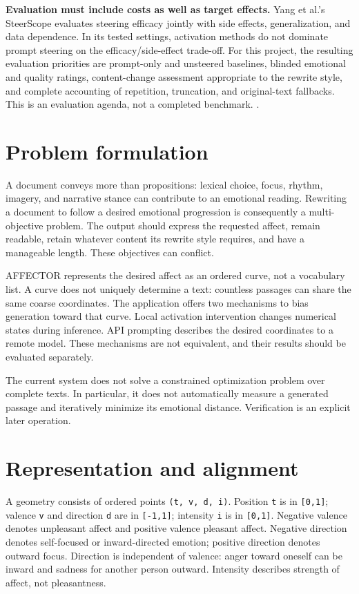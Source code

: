\documentclass[manuscript,screen,nonacm]{acmart}
\begin{document}
\textbf{Evaluation must include costs as well as target effects.} Yang
et al.'s SteerScope evaluates steering efficacy jointly with side
effects, generalization, and data dependence. In its tested settings,
activation methods do not dominate prompt steering on the
efficacy/side-effect trade-off. For this project, the resulting
evaluation priorities are prompt-only and unsteered baselines, blinded
emotional and quality ratings, content-change assessment appropriate to
the rewrite style, and complete accounting of repetition, truncation,
and original-text fallbacks. This is an evaluation agenda, not a
completed benchmark. \citep{yang2026steerscope}.

\section{Problem formulation}\label{problem-formulation}

A document conveys more than propositions: lexical choice, focus,
rhythm, imagery, and narrative stance can contribute to an emotional
reading. Rewriting a document to follow a desired emotional progression
is consequently a multi-objective problem. The output should express the
requested affect, remain readable, retain whatever content its rewrite
style requires, and have a manageable length. These objectives can
conflict.

AFFECTOR represents the desired affect as an ordered curve, not a
vocabulary list. A curve does not uniquely determine a text: countless
passages can share the same coarse coordinates. The application offers
two mechanisms to bias generation toward that curve. Local activation
intervention changes numerical states during inference. API prompting
describes the desired coordinates to a remote model. These mechanisms
are not equivalent, and their results should be evaluated separately.

The current system does not solve a constrained optimization problem
over complete texts. In particular, it does not automatically measure a
generated passage and iteratively minimize its emotional distance.
Verification is an explicit later operation.

\section{Representation and
alignment}\label{representation-and-alignment}

A geometry consists of ordered points \nolinkurl{(t, v, d, i)}. Position
\nolinkurl{t} is in \texttt{{[}0,1{]}}; valence \nolinkurl{v} and direction
\nolinkurl{d} are in \texttt{{[}-1,1{]}}; intensity \nolinkurl{i} is in
\texttt{{[}0,1{]}}. Negative valence denotes unpleasant affect and
positive valence pleasant affect. Negative direction denotes
self-focused or inward-directed emotion; positive direction denotes
outward focus. Direction is independent of valence: anger toward oneself
can be inward and sadness for another person outward. Intensity
describes strength of affect, not pleasantness.
\end{document}
